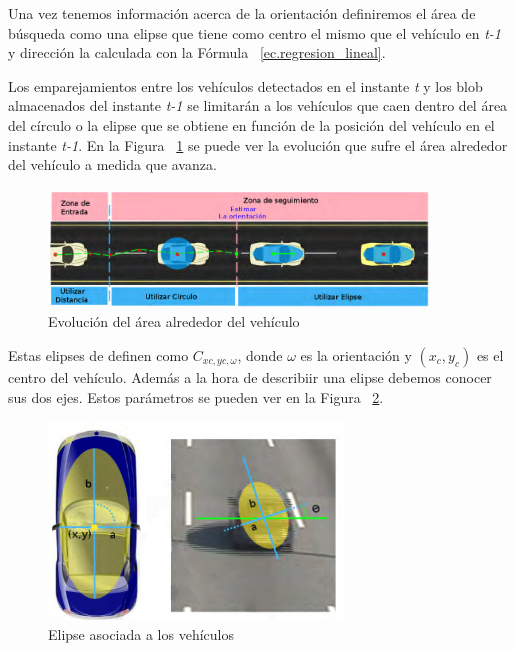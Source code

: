 Una vez tenemos información acerca de la orientación definiremos el área de búsqueda como una elipse que tiene como centro el mismo que el vehículo en \textit{t-1} y dirección la calculada con la Fórmula ~\ref{ec.regresion_lineal}.

Los emparejamientos entre los vehículos detectados en el instante \textit{t} y los blob almacenados del instante \textit{t-1} se limitarán a los vehículos que caen dentro del área del círculo o la elipse que se obtiene en función de la posición del vehículo en el instante \textit{t-1}. En la Figura ~\ref{fig.area_vehiculo} se puede ver la evolución que sufre el área alrededor del vehículo a medida que avanza.

 \begin{figure}[H] 
\begin{center}
	\includegraphics[width=0.9\textwidth]{figures/Diseno_global/areas_vehiculo.png}
   \caption{Evolución del área alrededor del vehículo}
	\label{fig.area_vehiculo}
\end{center}
\end{figure}


Estas elipses de definen como $C_{xc,yc,\omega}$, donde $\omega$ es la orientación y $(x_c, y_c)$ es el centro del vehículo. Además a la hora de describiir una elipse debemos conocer sus dos ejes. Estos parámetros se pueden ver en la Figura ~\ref{fig.elipse}.

 \begin{figure}[H] 
\begin{center}
    \includegraphics[width=0.7\textwidth]{figures/Diseno_global/elipse.png}
   \caption{Elipse asociada a los vehículos}
	\label{fig.elipse}
\end{center}
\end{figure}

